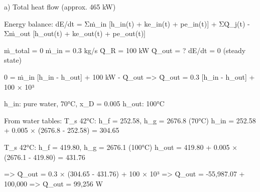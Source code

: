a) Total heat flow (approx. 465 kW)  

Energy balance:  
dE/dt = Σṁ_in [h_in(t) + ke_in(t) + pe_in(t)] + ΣQ̇_j(t) - Σṁ_out [h_out(t) + ke_out(t) + pe_out(t)]  

ṁ_total = 0  
ṁ_in = 0.3 kg/s  
Q̇_R = 100 kW  
Q̇_out = ?  
dE/dt = 0 (steady state)  

0 = ṁ_in [h_in - h_out] + 100 kW - Q̇_out  
=> Q̇_out = 0.3 [h_in - h_out] + 100 × 10³  

h_in: pure water, 70°C, x_D = 0.005  
h_out: 100°C  

From water tables:  
T_s 42°C: h_f = 252.58, h_g = 2676.8 (70°C)  
h_in = 252.58 + 0.005 × (2676.8 - 252.58) = 304.65  

T_s 42°C: h_f = 419.80, h_g = 2676.1 (100°C)  
h_out = 419.80 + 0.005 × (2676.1 - 419.80) = 431.76  

=> Q̇_out = 0.3 × (304.65 - 431.76) + 100 × 10³  
=> Q̇_out = -55,987.07 + 100,000  
=> Q̇_out = 99,256 W